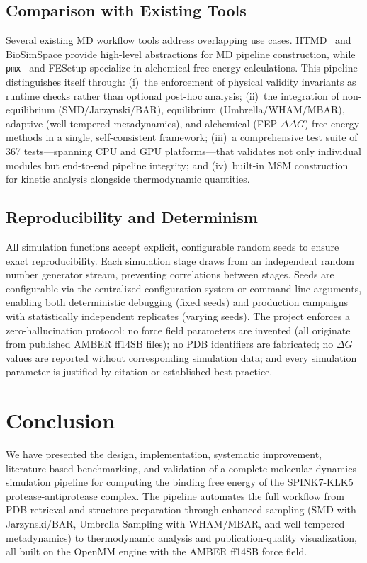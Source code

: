 \documentclass[conference]{IEEEtran}
\begin{document}
\subsection{Comparison with Existing Tools}

Several existing MD workflow tools address overlapping use cases.
HTMD~\cite{doerr2016} and BioSimSpace provide high-level abstractions for
MD pipeline construction, while \texttt{pmx}~\cite{gapsys2015} and
FESetup specialize in alchemical free energy calculations.  This pipeline
distinguishes itself through: (i)~the enforcement of physical validity
invariants as runtime checks rather than optional post-hoc analysis;
(ii)~the integration of non-equilibrium (SMD/Jarzynski/BAR), equilibrium
(Umbrella/WHAM/MBAR), adaptive (well-tempered metadynamics), and
alchemical (FEP $\Delta\Delta G$) free energy methods in a single,
self-consistent framework; (iii)~a comprehensive test suite of 367 tests---spanning CPU and
GPU platforms---that validates not only individual modules but end-to-end
pipeline integrity; and (iv)~built-in MSM construction for kinetic analysis
alongside thermodynamic quantities.

\subsection{Reproducibility and Determinism}

All simulation functions accept explicit, configurable random seeds to
ensure exact reproducibility.  Each simulation stage draws from an
independent random number generator stream, preventing correlations between
stages.  Seeds are configurable via the centralized configuration system
or command-line arguments, enabling both deterministic debugging
(fixed seeds) and production campaigns with statistically independent
replicates (varying seeds).  The project enforces a zero-hallucination
protocol: no force field parameters are invented (all originate from
published AMBER ff14SB files); no PDB identifiers are fabricated; no
$\Delta G$ values are reported without corresponding simulation data; and
every simulation parameter is justified by citation or established best
practice.

\section{Conclusion}\label{sec:conclusion}

We have presented the design, implementation, systematic improvement,
literature-based benchmarking, and validation of a complete molecular
dynamics simulation pipeline for computing the binding free energy of the
SPINK7-KLK5 protease-antiprotease complex.  The pipeline automates the
full workflow from PDB retrieval and structure preparation through enhanced
sampling (SMD with Jarzynski/BAR, Umbrella Sampling with WHAM/MBAR, and
well-tempered metadynamics) to thermodynamic analysis and
publication-quality visualization, all built on the OpenMM engine with the
AMBER ff14SB force field.
\end{document}
